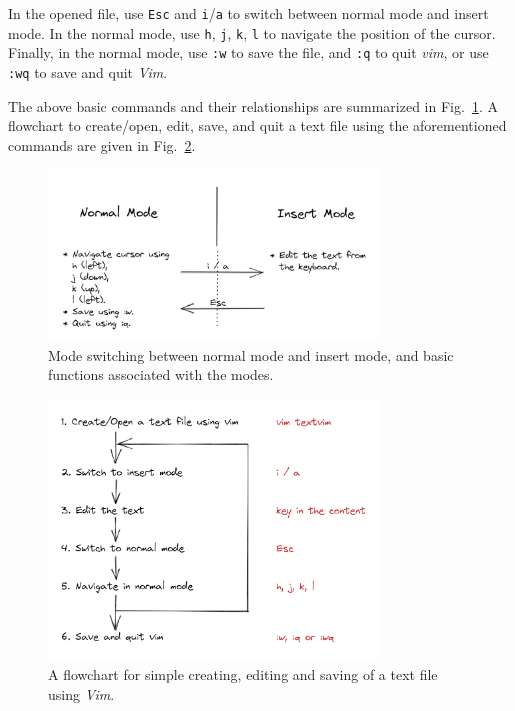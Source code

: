In the opened file, use \verb|Esc| and \verb|i|/\verb|a| to switch between normal mode and insert mode. In the normal mode, use \verb|h|, \verb|j|, \verb|k|, \verb|l| to navigate the position of the cursor. Finally, in the normal mode, use \verb|:w| to save the file, and \verb|:q| to quit \textit{vim}, or use \verb|:wq| to save and quit \textit{Vim}.

The above basic commands and their relationships are summarized in Fig.~\ref{ch3fig:vimbasicmodeswitching}. A flowchart to create/open, edit, save, and quit a text file using the aforementioned commands are given in Fig.~\ref{ch3fig:vimbasicoperationflowchart}.

\begin{figure}
\centering
\includegraphics[width=250pt]{chapters/ch_text_file_editing/figures/vimbasicmodeswitching.png}
\caption{Mode switching between normal mode and insert mode, and basic functions associated with the modes.} \label{ch3fig:vimbasicmodeswitching}
\end{figure}

\begin{figure}
\centering
\includegraphics[width=250pt]{chapters/ch_text_file_editing/figures/vimbasicoperationflowchart.png}
\caption{A flowchart for simple creating, editing and saving of a text file using \textit{Vim}.} \label{ch3fig:vimbasicoperationflowchart}
\end{figure}

